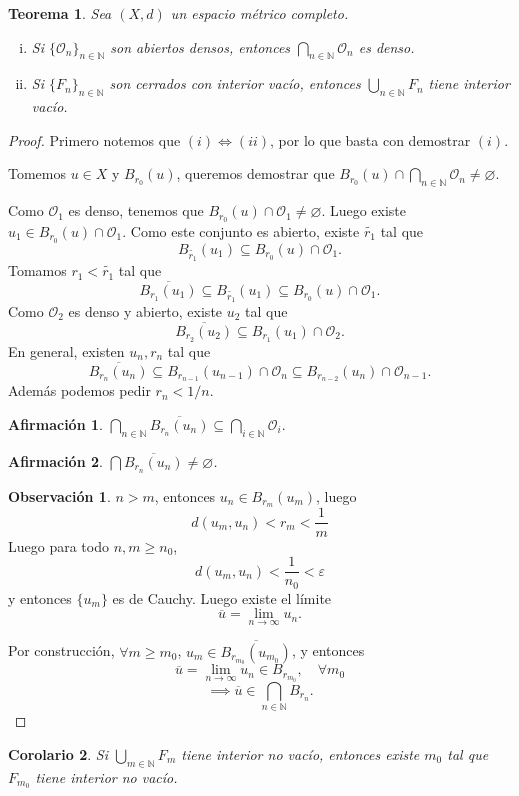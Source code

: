 \documentclass{article}
\newtheorem{theorem}{Teorema}[subsection]
\newtheorem{claim}{Afirmación}
\newtheorem{corollary}[theorem]{Corolario}
\theoremstyle{definition}
\newtheorem*{obs}{Observación}
\theoremstyle{remark}
\numberwithin{equation}{section}
\newcommand{\N}{\mathbb{N}}
\renewcommand{\O}{\mathcal{O}}
\newcommand{\e}{\varepsilon}
\newcommand{\oo}{\infty}
\renewcommand{\bar}{\overline}
\renewcommand{\tilde}{\widetilde}
\newcommand{\ds}{\displaystyle}
\begin{document}
\begin{theorem}
  Sea $(X,d)$ un espacio métrico completo.
  \begin{enumerate}[(i)]
    \item Si $\{\O_n\}_{n\in\N}$ son abiertos densos, entonces $\ds \bigcap_{n\in\N} \O_n$ es denso.
    \item Si $\{F_n\}_{n\in\N}$ son cerrados con interior vacío, entonces $\ds \bigcup_{n\in\N} F_n$ tiene interior vacío.
  \end{enumerate}
\end{theorem}
\begin{proof}
  Primero notemos que $(i) \iff (ii)$, por lo que basta con demostrar $(i)$.

  Tomemos $u \in X$ y $B_{r_0}(u)$, queremos demostrar que $B_{r_0}(u) \cap \bigcap_{n\in\N} \O_n \neq \varnothing$.

  Como $\O_1$ es denso, tenemos que $B_{r_0}(u) \cap \O_1 \neq \varnothing$. Luego existe $u_1 \in B_{r_0}(u) \cap \O_1$. Como este conjunto es abierto, existe $\tilde{r_1}$ tal que
  \[B_{\tilde{r_1}}(u_1) \subseteq B_{r_0}(u) \cap \O_1.\]
  Tomamos $r_1 < \tilde{r_1}$ tal que $$\bar{B_{r_1}(u_1)} \subseteq B_{\tilde{r_1}}(u_1) \subseteq B_{r_0}(u) \cap \O_1.$$
  Como $\O_2$ es denso y abierto, existe $u_2$ tal que
  \[\bar{B_{r_2}(u_2)} \subseteq B_{r_1}(u_1) \cap \O_2.\]
  En general, existen $u_n,r_n$ tal que
  \[\bar{B_{r_n}(u_n)} \subseteq B_{r_{n-1}}(u_{n-1}) \cap \O_n \subseteq B_{r_{n-2}}(u_n) \cap \O_{n-1}.\]
  Además podemos pedir $r_n < 1/n$.
  \begin{claim}
    $\ds \bigcap_{n\in\N} \bar{B_{r_n}(u_n)} \subseteq \bigcap_{i\in\N} \O_i.$
  \end{claim}
  \begin{claim}
    $\ds \bigcap \bar{B_{r_n}(u_n)} \neq \varnothing$.
  \end{claim}
  \begin{obs}
    $n>m$, entonces $u_n \in B_{r_m}(u_m)$, luego
    \[d(u_m,u_n) < r_m < \frac1m\]
    Luego para todo $n,m \geq n_0$,
    \[d(u_m,u_n) < \frac{1}{n_0} < \e\]
    y entonces $\{u_m\}$ es de Cauchy. Luego existe el límite
    \[\bar{u} = \lim_{n\to\oo} u_n.\]
  \end{obs}
  Por construcción, $\forall m \geq m_0$, $u_m \in \bar{B_{r_{m_0}}(u_{m_0})}$, y entonces
  \[\bar u = \lim_{n\to\oo} u_n \in B_{r_{m_0}}, \quad \forall m_0\]
  \[\implies \bar u \in \bigcap_{n\in\N} B_{r_n}.\]
\end{proof}

\begin{corollary}
  Si $\ds \bigcup_{m\in\N} F_m$ tiene interior no vacío, entonces existe $m_0$ tal que $F_{m_0}$ tiene interior no vacío.
\end{corollary}
\end{document}
